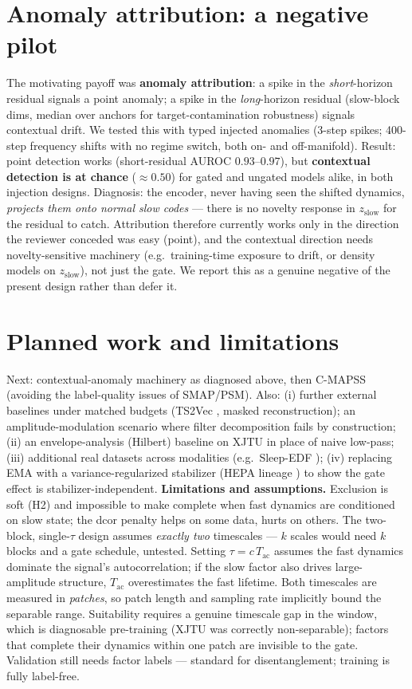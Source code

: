 \documentclass[10pt,twocolumn]{article}
\begin{document}
\section{Anomaly attribution: a negative pilot}
The motivating payoff was \textbf{anomaly attribution}: a spike in the
\emph{short}-horizon residual signals a point anomaly; a spike in the
\emph{long}-horizon residual (slow-block dims, median over anchors for
target-contamination robustness) signals contextual drift. We tested this
with typed injected anomalies (3-step spikes; 400-step frequency shifts with
no regime switch, both on- and off-manifold). Result: point detection works
(short-residual AUROC $0.93$--$0.97$), but \textbf{contextual detection is at
chance} ($\approx\!0.50$) for gated and ungated models alike, in both
injection designs. Diagnosis: the encoder, never having seen the shifted
dynamics, \emph{projects them onto normal slow codes} --- there is no novelty
response in $z_{\mathrm{slow}}$ for the residual to catch. Attribution
therefore currently works only in the direction the reviewer conceded was
easy (point), and the contextual direction needs novelty-sensitive machinery
(e.g.\ training-time exposure to drift, or density models on
$z_{\mathrm{slow}}$), not just the gate. We report this as a genuine negative
of the present design rather than defer it.

\section{Planned work and limitations}
Next: contextual-anomaly machinery as diagnosed above, then C-MAPSS
\cite{saxena2008damage} (avoiding the label-quality issues of SMAP/PSM). Also:
(i) further external baselines under matched budgets (TS2Vec
\cite{yue2022ts2vec}, masked reconstruction); an amplitude-modulation
scenario where filter decomposition fails by construction; (ii) an
envelope-analysis (Hilbert) baseline on XJTU in place of naive low-pass;
(iii) additional real datasets across modalities (e.g.\ Sleep-EDF
\cite{kemp2000analysis}); (iv) replacing EMA with a variance-regularized
stabilizer (HEPA lineage \cite{hepa2026}) to show the gate effect is
stabilizer-independent.
\textbf{Limitations and assumptions.} Exclusion is soft (H2) and impossible to
make complete when fast dynamics are conditioned on slow state; the dcor
penalty helps on some data, hurts on others. The two-block, single-$\tau$
design assumes \emph{exactly two} timescales --- $k$ scales would need $k$
blocks and a gate schedule, untested. Setting $\tau=c\,T_{\mathrm{ac}}$
assumes the fast dynamics dominate the signal's autocorrelation; if the slow
factor also drives large-amplitude structure, $T_{\mathrm{ac}}$ overestimates
the fast lifetime. Both timescales are measured in \emph{patches}, so patch
length and sampling rate implicitly bound the separable range. Suitability
requires a genuine timescale gap in the window, which is diagnosable
pre-training (XJTU was correctly non-separable); factors that complete their
dynamics within one patch are invisible to the gate. Validation still needs
factor labels --- standard for disentanglement; training is fully label-free.
\end{document}
